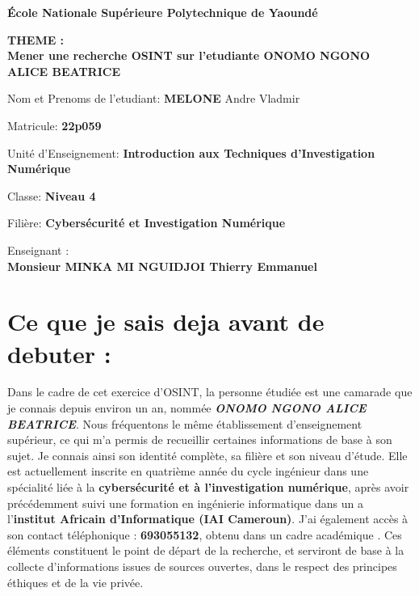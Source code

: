 \documentclass[14pt]{article}
\begin{document}
\begin{titlepage}
    \centering
    \vspace*{1cm}
    {\Huge\bfseries École Nationale Supérieure Polytechnique de Yaoundé \par}
    \vspace{1.5cm}
    {\Huge\bfseries THEME : \\ Mener une recherche OSINT sur l'etudiante ONOMO NGONO ALICE BEATRICE \par}
    \vspace{1.5cm}
    {\Large Nom et Prenoms de l'etudiant: \textbf{MELONE} Andre Vladmir \par}
    \vspace{0.5cm}
    {\large Matricule: \textbf{22p059} \par}
    \vspace{0.5cm}
    {\large Unité d'Enseignement: \textbf{Introduction aux Techniques d'Investigation Numérique} \par}
    \vspace{0.5cm}
    {\large Classe:\textbf{ Niveau 4} \par}
    \vspace{0.5cm}
    {\large Filière: \textbf{Cybersécurité et Investigation Numérique} \par}
    \vspace{2cm}
    {\large Enseignant : \\ \textbf{Monsieur MINKA MI NGUIDJOI Thierry Emmanuel} \par}
    \vspace{1cm}

\end{titlepage}


\newpage
\tableofcontents
\newpage

\section{Ce que je sais deja avant de debuter :  }

Dans le cadre de cet exercice d’OSINT, la personne étudiée est une camarade que je connais depuis environ un an, nommée \textbf{\textit{ONOMO NGONO ALICE BEATRICE}}. Nous fréquentons le même établissement d’enseignement supérieur, ce qui m’a permis de recueillir certaines informations de base à son sujet.
Je connais ainsi son identité complète, sa filière et son niveau d’étude. Elle est actuellement inscrite en quatrième année du cycle ingénieur dans une spécialité liée à la \textbf{cybersécurité et à l’investigation numérique}, après avoir précédemment suivi une formation en ingénierie informatique dans un a l'\textbf{institut Africain d'Informatique (IAI Cameroun)}.
J’ai également accès à son contact téléphonique : \textbf{693055132}, obtenu dans un cadre académique . Ces éléments constituent le point de départ de la recherche, et serviront de base à la collecte d’informations issues de sources ouvertes, dans le respect des principes éthiques et de la vie privée.
\end{document}
